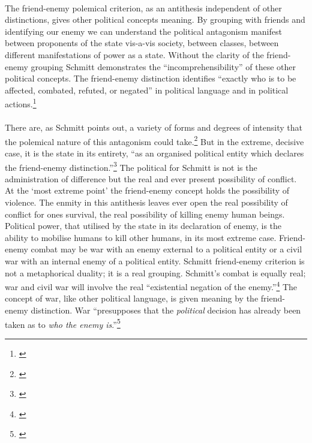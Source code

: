 \documentclass[12pt,a4paper,titlepage]{article}
\begin{document}
\paragraph{}The friend-enemy polemical criterion, as an antithesis independent of other distinctions, gives other political concepts meaning. By grouping with friends and identifying our enemy we can understand the political antagonism manifest between proponents of the state vis-a-vis society, between classes, between different manifestations of power as a state. Without the clarity of the friend-enemy grouping Schmitt demonstrates the ``incomprehensibility'' of these other political concepts. The friend-enemy distinction identifies ``exactly who is to be affected, combated, refuted, or negated'' in political language and in political actions.\footnote{\cite[p.31]{schmitt:2007cop}}

\paragraph{}There are, as Schmitt points out, a variety of forms and degrees of intensity that the polemical nature of this antagonism could take.\footnote{\cite[p.31 fn.12]{schmitt:2007cop}} But in the extreme, decisive case, it is the state in its entirety, ``as an organised political entity which declares the friend-enemy distinction.''\footnote{\cite[p.29-30]{schmitt:2007cop}} The political for Schmitt is not is the administration of difference but the real and ever present possibility of conflict. At the `most extreme point' the friend-enemy concept holds the possibility of violence. The enmity in this antithesis leaves ever open the real possibility of conflict for ones survival, the real possibility of killing enemy human beings. Political power, that utilised by the state in its declaration of enemy, is the ability to mobilise humans to kill other humans, in its most extreme case. Friend-enemy combat may be war with an enemy external to a political entity or a civil war with an internal enemy of a political entity. Schmitt friend-enemy criterion is not a metaphorical duality; it is a real grouping. Schmitt's combat is equally real; war and civil war will involve the real ``existential negation of the enemy.''\footnote{\cite[p.33]{schmitt:2007cop}} The concept of war, like other political language, is given meaning by the friend-enemy distinction. War ``presupposes that the \emph{political} decision has already been taken as to \emph{who the enemy is}.''\footnote{\cite[p.34, emphasis added]{schmitt:2007cop}}
\end{document}
